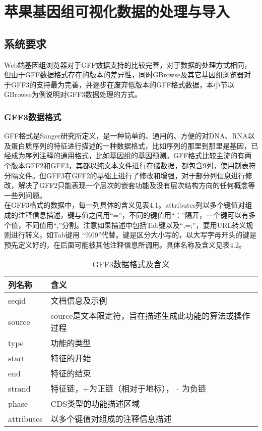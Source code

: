 \chapter{苹果基因组可视化数据的处理与导入}
	\section{系统要求}
	Web端基因组浏览器对于GFF数据支持的比较完善，对于数据的处理方式相同，但由于GFF数据格式存在的版本的差异性，同时GBrowse及其它基因组浏览器对于GFF3的支持最为完善，并逐步在废弃低版本的GFF格式数据，本小节以GBrowse为例说明对GFF3数据处理的方式。
	\subsection{GFF3数据格式}
	GFF格式是Sanger研究所定义，是一种简单的、通用的、方便的对DNA、RNA以及蛋白质序列的特征进行描述的一种数据格式，比如序列的那里到那里是基因，已经成为序列注释的通用格式，比如基因组的基因预测。GFF格式比较主流的有两个版本GFF2和GFF3，其都以纯文本文件进行存储数据，都包含9列，使用制表符分隔文件。但GFF3在GFF2的基础上进行了修改和增强，对于部分列信息进行修改，解决了GFF2只能表现一个层次的嵌套功能及没有层次结构方向的任何概念等一些列问题。\\
	\indent 在GFF3格式的数据中，每一列具体的含义见表4.1。attributes列以多个键值对组成的注释信息描述，键与值之间用“=”，不同的键值用“：”隔开，一个键可以有多个值，不同值用“,”分割。注意如果描述中包括Tab键以及“,=;”，要用URL转义规则进行转义，如Tab键用 “\%09”代替。键是区分大小写的，以大写字母开头的键是预先定义好的，在后面可能被其他注释信息所调用。具体名称及含义见表4.2。
	\begin{table}[!htbp]
		\centering
		\begin{tabular}{ll}	
			\toprule
			列名称& 含义\\
			\midrule
			seqid&文档信息及示例\\
			source&source是文本限定符，旨在描述生成此功能的算法或操作过程\\
			type&功能的类型\\
			start&特征的开始 \\
			end&特征的结束\\
			strand&特征链，+为正链（相对于地标）， - 为负链\\
			phase&CDS类型的功能描述区域\\
			attributes&以多个键值对组成的注释信息描述\\
			\bottomrule
		\end{tabular}
		\caption{GFF3数据格式及含义}
	\end{table}
	
